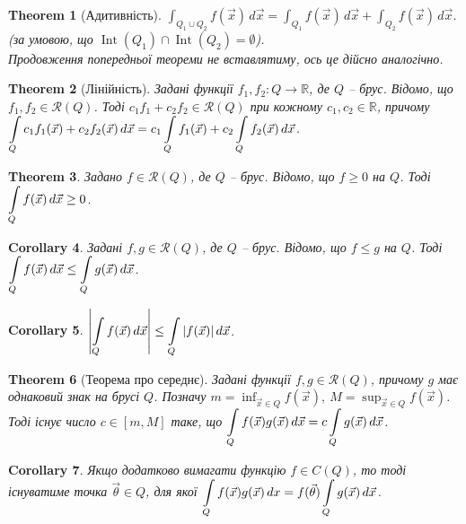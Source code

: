 \documentclass[a4paper, 10pt]{article}
\theoremstyle{theoremdd}
\newtheorem{theorem}{Theorem}[subsection]
\theoremstyle{theoremdd}
\theoremstyle{theoremdd}
\theoremstyle{theoremdd}
\theoremstyle{theoremdd}
\theoremstyle{theoremdd}
\theoremstyle{theoremdd}
\theoremstyle{theoremdd}
\newtheorem{corollary}[theorem]{Corollary}
\DeclareMathOperator{\Int}{Int}
\begin{document}
\begin{theorem}[Адитивність]
$\displaystyle\int_{Q_1 \cup Q_2} f(\vec{x})\,d\vec{x} = \int_{Q_1} f(\vec{x})\,d\vec{x} + \int_{Q_2} f(\vec{x})\,d\vec{x}$. \qquad (за умовою, що $\Int(Q_1) \cap \Int(Q_2) = \emptyset$).\\
\textit{Продовження попередньої теореми не вставлятиму, ось це дійсно аналогічно.}
\end{theorem}

\begin{theorem}[Лінійність]
Задані функції $f_1,f_2 \colon Q \to \mathbb{R}$, де $Q$ -- брус. Відомо, що $f_1,f_2 \in \mathcal{R}(Q)$. Тоді $c_1 f_1 + c_2 f_2 \in \mathcal{R}(Q)$ при кожному $c_1,c_2 \in \mathbb{R}$, причому\\
$\displaystyle\int\displaylimits_Q c_1 f_1(\vec{x}) + c_2 f_2(\vec{x})\,d\vec{x} = c_1 \int\displaylimits_Q f_1(\vec{x}) + c_2 \int\displaylimits_Q f_2(\vec{x})\,d\vec{x}$.
\end{theorem}

\begin{theorem}
Задано $f \in \mathcal{R}(Q)$, де $Q$ -- брус. Відомо, що $f \geq 0$ на $Q$. Тоді $\displaystyle\int\displaylimits_Q f(\vec{x})\,d\vec{x} \geq 0$.
\end{theorem}

\begin{corollary}
Задані $f,g \in \mathcal{R}(Q)$, де $Q$ -- брус. Відомо, що $f \leq g$ на $Q$. Тоді $\displaystyle\int\displaylimits_Q f(\vec{x})\,d\vec{x} \leq \int\displaylimits_Q g(\vec{x})\,d\vec{x}$.
\end{corollary}

\begin{corollary}
$\displaystyle\left| \int\displaylimits_Q f(\vec{x})\,d\vec{x} \right| \leq \int\displaylimits_Q |f(\vec{x})|\,d\vec{x}$.
\end{corollary}

\begin{theorem}[Теорема про середнє]
Задані функції $f,g \in \mathcal{R}(Q)$, причому $g$ має однаковий знак на брусі $Q$. Позначу $m = \displaystyle\inf_{\vec{x} \in Q} f(\vec{x}),\ M = \sup_{\vec{x} \in Q} f(\vec{x})$. Тоді існує число $c \in [m,M]$ таке, що $\displaystyle\int\displaylimits_Q f(\vec{x})g(\vec{x})\,d\vec{x} = c \int\displaylimits_Q g(\vec{x})\,d\vec{x}$.
\end{theorem}

\begin{corollary}
Якщо додатково вимагати функцію $f \in C(Q)$, то тоді існуватиме точка $\vec{\theta} \in Q$, для якої $\displaystyle\int\displaylimits_Q f(\vec{x})g(\vec{x})\,dx = f(\vec{\theta}) \int\displaylimits_Q g(\vec{x})\,d\vec{x}$.
\end{corollary}
\end{document}
